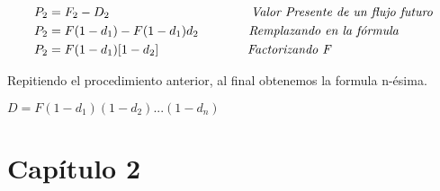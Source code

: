 \begin{spacing}{1.5}
\begin{center}
\begin{align*}
    P_{2} &= F_{2}-D_{2}\hspace{113 pt} \textit{Valor Presente de un flujo futuro}\\ 
    P_{2} &= F(1-d_{1})-F(1-d_{1})d_{2} \hspace{40 pt} \textit{Remplazando en la fórmula}\\
    P_{2} &= F(1-d_{1})[1-d_{2}]\hspace{71 pt}\textit{Factorizando F}\\
\end{align*}
\end{center}
Repitiendo el procedimiento anterior, al final obtenemos la formula n-ésima.
\begin{center}
$D=F(1-d_{1} )(1-d_{2} )...(1-d_{n})$
\end{center}
\end{spacing}
\clearpage
\section{Capítulo 2}

